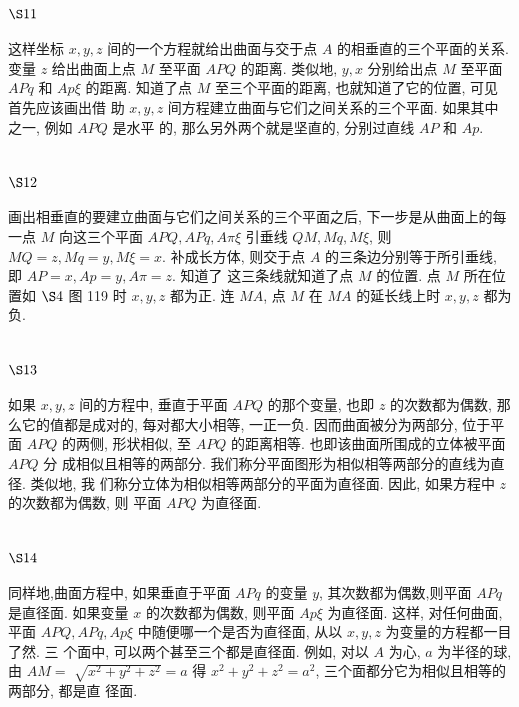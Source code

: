 \section{$\S 11$}

这样坐标 $x, y, z$ 间的一个方程就给出曲面与交于点 $A$ 的相垂直的三个平面的关系. 变量 $z$ 给出曲面上点 $M$ 至平面 $A P Q$ 的距离. 类似地, $y, x$ 分别给出点 $M$ 至平面 $A P q$ 和 $A p \xi$ 的距离. 知道了点 $M$ 至三个平面的距离, 也就知道了它的位置, 可见首先应该画出借 助 $x, y, z$ 间方程建立曲面与它们之间关系的三个平面. 如果其中之一, 例如 $A P Q$ 是水平 的, 那么另外两个就是坚直的, 分别过直线 $A P$ 和 $A p$.

\section{$\S 12$}

画出相垂直的要建立曲面与它们之间关系的三个平面之后, 下一步是从曲面上的每 一点 $M$ 向这三个平面 $A P Q, A P q, A \pi \xi$ 引垂线 $Q M, M q, M \xi$, 则 $M Q=z, M q=y, M \xi=x$. 补成长方体, 则交于点 $A$ 的三条边分别等于所引垂线, 即 $A P=x, A p=y, A \pi=z$. 知道了 这三条线就知道了点 $M$ 的位置. 点 $M$ 所在位置如 $\S 4$ 图 119 时 $x, y, z$ 都为正. 连 $M A$, 点 $M$ 在 $M A$ 的延长线上时 $x, y, z$ 都为负.

\section{$\S 13$}

如果 $x, y, z$ 间的方程中, 垂直于平面 $A P Q$ 的那个变量, 也即 $z$ 的次数都为偶数, 那 么它的值都是成对的, 每对都大小相等, 一正一负. 因而曲面被分为两部分, 位于平面 $A P Q$ 的两侧, 形状相似, 至 $A P Q$ 的距离相等. 也即该曲面所围成的立体被平面 $A P Q$ 分 成相似且相等的两部分. 我们称分平面图形为相似相等两部分的直线为直径. 类似地, 我 们称分立体为相似相等两部分的平面为直径面. 因此, 如果方程中 $z$ 的次数都为偶数, 则 平面 $A P Q$ 为直径面.

\section{$\S 14$}

同样地,曲面方程中, 如果垂直于平面 $A P q$ 的变量 $y$, 其次数都为偶数,则平面 $A P q$ 是直径面. 如果变量 $x$ 的次数都为偶数, 则平面 $A p \xi$ 为直径面. 这样, 对任何曲面, 平面 $A P Q, A P q, A p \xi$ 中随便哪一个是否为直径面, 从以 $x, y, z$ 为变量的方程都一目了然. 三 个面中, 可以两个甚至三个都是直径面. 例如, 对以 $A$ 为心, $a$ 为半径的球, 由 $A M=$ $\sqrt{x^{2}+y^{2}+z^{2}}=a$ 得 $x^{2}+y^{2}+z^{2}=a^{2}$, 三个面都分它为相似且相等的两部分, 都是直 径面.

